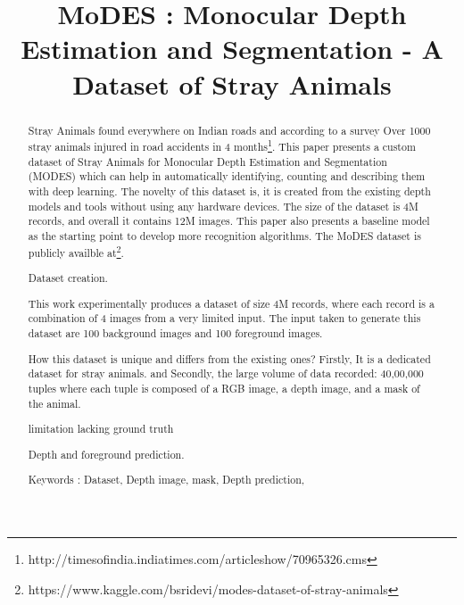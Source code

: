 \documentclass{article}
\title{MoDES : Monocular Depth Estimation and Segmentation - A Dataset of Stray Animals}
\begin{document}
\maketitle

\begin{abstract}
Stray Animals found everywhere on Indian roads and according to a survey Over 1000 stray animals injured in road accidents in 4 months\footnote{http://timesofindia.indiatimes.com/articleshow/70965326.cms}. This paper presents a custom dataset of Stray Animals for Monocular Depth Estimation and Segmentation (MODES) which can help in automatically identifying, counting and describing them with deep learning. The novelty of this dataset is, it is created from the existing depth models and tools without using any hardware devices. The size of the dataset is 4M records, and overall it contains 12M images. This paper also presents a baseline model as the starting point to develop more recognition algorithms. The MoDES dataset is publicly availble at\footnote{https://www.kaggle.com/bsridevi/modes-dataset-of-stray-animals}.



Dataset creation. 

This work experimentally produces a dataset of size 4M records, where each record is a combination of 4 images from a very limited input. The input taken to generate this dataset are 100 background images and 100 foreground images.

How this dataset is unique and differs from the existing ones?  Firstly, It is a dedicated dataset for stray animals. and Secondly, the large
volume of data recorded: 40,00,000 tuples where each tuple is composed of a RGB image, a depth image, and a mask of the animal. 

limitation lacking ground truth

Depth and foreground prediction.


Keywords : Dataset, Depth image, mask, Depth prediction,
\end{abstract}

 
\end{document}
